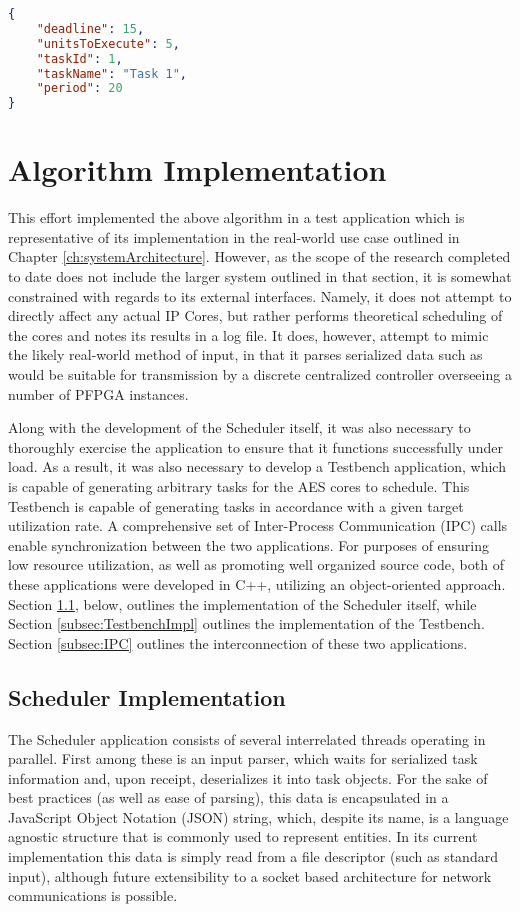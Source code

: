 \begin{lstlisting}[language=json, caption={An example task object, presented in JSON}, captionpos=b, float]
{
    "deadline": 15,
    "unitsToExecute": 5,
    "taskId": 1,
    "taskName": "Task 1",
    "period": 20
}
\end{lstlisting}

\section{Algorithm Implementation}\label{sec:Impl}

This effort implemented the above algorithm in a test application which is representative of its implementation in the real-world use case outlined in Chapter \ref{ch:systemArchitecture}. However, as the scope of the research completed to date does not include the larger system outlined in that section, it is somewhat constrained with regards to its external interfaces. Namely, it does not attempt to directly affect any actual IP Cores, but rather performs theoretical scheduling of the cores and notes its results in a log file. It does, however, attempt to mimic the likely real-world method of input, in that it parses serialized data such as would be suitable for transmission by a discrete centralized controller overseeing a number of PFPGA instances.

Along with the development of the Scheduler itself, it was also necessary to thoroughly exercise the application to ensure that it functions successfully under load. As a result, it was also necessary to develop a Testbench application, which is capable of generating arbitrary tasks for the AES cores to schedule. This Testbench is capable of generating tasks in accordance with a given target utilization rate. A comprehensive set of Inter-Process Communication (IPC) calls enable synchronization between the two applications. For purposes of ensuring low resource utilization, as well as promoting well organized source code, both of these applications were developed in C++, utilizing an object-oriented approach. Section \ref{subsec:SchedulerImpl}, below, outlines the implementation of the Scheduler itself, while Section \ref{subsec:TestbenchImpl} outlines the implementation of the Testbench. Section \ref{subsec:IPC} outlines the interconnection of these two applications.

\subsection{Scheduler Implementation}\label{subsec:SchedulerImpl}
The Scheduler application consists of several interrelated threads operating in parallel. First among these is an input parser, which waits for serialized task information and, upon receipt, deserializes it into task objects. For the sake of best practices (as well as ease of parsing), this data is encapsulated in a JavaScript Object Notation (JSON) string, which, despite its name, is a language agnostic structure that is commonly used to represent entities. In its current implementation this data is simply read from a file descriptor (such as standard input), although future extensibility to a socket based architecture for network communications is possible.

